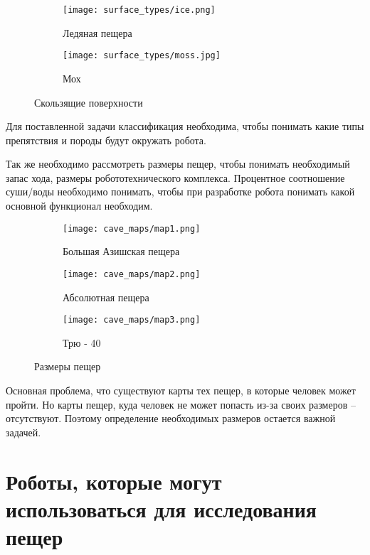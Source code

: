 \begin{figure}[H]
\begin{subfigure}{0.49\textwidth}
\centering\texttt{[image: surface\_types/ice.png]}\\
\caption{Ледяная пещера}
\label{fig:ice}
\end{subfigure}
\begin{subfigure}{0.49\textwidth}
\centering\texttt{[image: surface\_types/moss.jpg]}\\
\caption{Мох}
\label{fig:moss}
\end{subfigure}
\caption{Скользящие поверхности}
\label{fig:slippery_surfaces}
\end{figure}

Для поставленной задачи классификация необходима, чтобы понимать какие типы препятствия и породы будут окружать робота.

Так же необходимо рассмотреть размеры пещер, чтобы понимать необходимый запас хода, размеры робототехнического комплекса. Процентное соотношение суши/воды необходимо понимать, чтобы при разработке робота понимать какой основной функционал необходим.

\begin{figure}[H]
\begin{subfigure}{0.8\textwidth}
\centering\texttt{[image: cave\_maps/map1.png]}\\
\caption{Большая Азишская пещера}
\label{fig:ice}
\end{subfigure}
\begin{subfigure}{0.8\textwidth}
\centering\texttt{[image: cave\_maps/map2.png]}\\
\caption{Абсолютная пещера}
\end{subfigure}
\begin{subfigure}{0.8\textwidth}
\centering\texttt{[image: cave\_maps/map3.png]}\\
\caption{Трю - 40}
\end{subfigure}
\caption{Размеры пещер}
\end{figure}

Основная проблема, что существуют карты тех пещер, в которые человек может пройти. Но карты пещер, куда человек не может попасть из-за своих размеров -- отсутствуют. Поэтому определение необходимых размеров остается важной задачей.

\section{Роботы, которые могут использоваться для исследования пещер}

